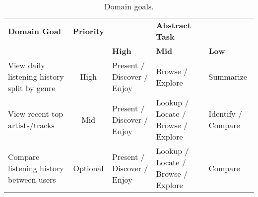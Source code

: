 \begin{table*}[tb]
  \caption{Domain goals.}
  \label{tab:taskanalysis}
  \scriptsize%
    \centering%
  \begin{tabular}{lc>{\centering\arraybackslash}p{3cm}>{\centering\arraybackslash}p{4cm}>{\centering\arraybackslash}p{3cm}}
  \toprule
  {\textbf{Domain Goal}} & {\textbf{Priority}} & & {\textbf{Abstract Task}} & \\
   &  & \textbf{High} & \textbf{Mid} & \textbf{Low} \\
  
  \midrule

  {View daily listening history split by genre} & {High} & {Present / Discover / Enjoy} & {Browse / Explore} & {Summarize} \\
  
  {View recent top artists/tracks} & {Mid} & {Present / Discover / Enjoy} & {Lookup / Locate / Browse / Explore} & {Identify / Compare} \\
  
  {Compare listening history between users} & {Optional} & {Present / Discover / Enjoy} & {Lookup / Locate / Browse / Explore} & {Compare} \\
  \bottomrule
  \end{tabular}%
\end{table*}